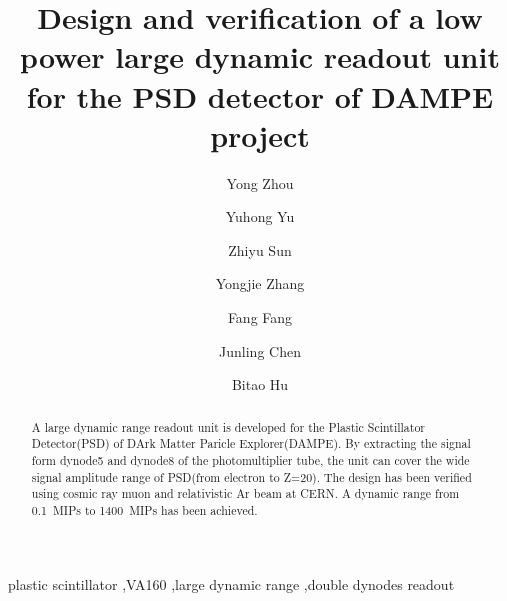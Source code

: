 \documentclass[5p, times]{elsarticle}
\begin{document}
\begin{frontmatter}

\title{Design and verification of a low power large dynamic readout unit for the PSD detector of DAMPE project}

\author[imp,lzu,ucas]{Yong Zhou}

\author[imp]{Yuhong Yu}

\author[imp]{Zhiyu Sun}
\author[imp]{Yongjie Zhang}
\author[imp]{Fang Fang}
\author[imp]{Junling Chen}

\author[lzu]{Bitao Hu}

\address[imp]{Institute of Modern Physics, Chinese Academy of Sciences,  509 Nanchang Road,  Lanzhou,  730000,  P.R.China}
\address[lzu]{School of Nuclear Science and Technology,  Lanzhou University,  222 South Tianshui Road,  Lanzhou,  730000,  P.R.China}
\address[ucas]{Graduate University of the Chinese Academy of Sciences,  19A Yuquan Road,  Beijing,  100049,  P.R.China}

\begin{abstract}

A large dynamic range readout unit is developed for the Plastic Scintillator Detector(PSD) of DArk Matter Paricle Explorer(DAMPE).
By extracting the signal form dynode5 and dynode8 of the photomultiplier tube, the unit can cover the wide signal amplitude range of PSD(from electron to Z=20).
The design has been verified using cosmic ray muon and relativistic Ar beam at CERN.
A dynamic range from \SI{0.1}{MIPs} to \SI{1400}{MIPs} has been achieved.

\end{abstract}

\begin{keyword}
plastic scintillator
\sep VA160
\sep large dynamic range
\sep double dynodes readout


\end{keyword}

\end{frontmatter}
\end{document}
